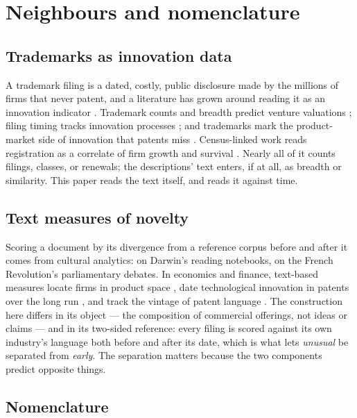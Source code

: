 \section{Neighbours and nomenclature}\label{sec:related}

\subsection{Trademarks as innovation data}

A trademark filing is a dated, costly, public disclosure made by the
millions of firms that never patent, and a literature has grown around
reading it as an innovation indicator \citep{Castaldi2020, Willeke2026}.
Trademark counts and breadth predict venture valuations
\citep{Block2014}; filing timing tracks innovation processes
\citep{Seip2018}; and trademarks mark the product-market side of
innovation that patents miss \citep{Flikkema2019, Flikkema2025}.
Census-linked work reads registration as a correlate of firm growth and
survival \citep{Dinlersoz2018, Dinlersoz2023}. Nearly all of it counts
filings, classes, or renewals; the descriptions' text enters, if at all,
as breadth or similarity. This paper reads the text itself, and reads it
against time.

\subsection{Text measures of novelty}

Scoring a document by its divergence from a reference corpus before and
after it comes from cultural analytics: \citet{Murdock2017} on Darwin's
reading notebooks, \citet{Barron2018} on the French Revolution's
parliamentary debates. In economics and finance, text-based measures
locate firms in product space \citep{HobergPhillips2016}, date
technological innovation in patents over the long run \citep{Kelly2021},
and track the vintage of patent language \citep{Kalyani2024}. The
construction here differs in its object --- the composition of commercial
offerings, not ideas or claims --- and in its two-sided reference: every
filing is scored against its own industry's language both before and
after its date, which is what lets \emph{unusual} be separated from
\emph{early}. The separation matters because the two components predict
opposite things.

\subsection{Nomenclature}\label{sec:nomenclature}


